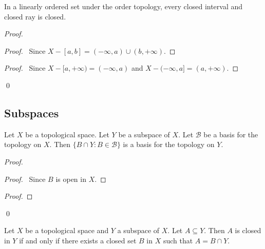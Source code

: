 \begin{prop}
In a linearly ordered set under the order topology, every closed interval and closed ray is closed.
\end{prop}

\begin{proof}
\pf
{}
\begin{proof}
	\pf\ Since $X - [a,b] = (-\infty, a) \cup (b, +\infty)$.
\end{proof}
\begin{proof}
	\pf\ Since $X - [a,+\infty) = (-\infty,a)$ and $X - (-\infty,a] = (a,+\infty)$.
\end{proof}
\qed
\end{proof}

\subsection{Subspaces}

\begin{prop}
\label{prop:basis_subspace}
Let $X$ be a topological space. Let $Y$ be a subspace of $X$. Let $\mathcal{B}$ be a basis for the topology on $X$. Then $\{ B \cap Y : B \in \mathcal{B} \}$ is a basis for the topology on $Y$.
\end{prop}

\begin{proof}
\pf
{}
\begin{proof}
	\pf\ Since $B$ is open in $X$.
\end{proof}
\begin{proof}
\end{proof}
\qed
\end{proof}

\begin{prop}
Let $X$ be a topological space and $Y$ a subspace of $X$. Let $A \subseteq Y$. Then $A$ is closed in $Y$ if and only if there exists a closed set $B$ in $X$ such that $A = B \cap Y$.
\end{prop}

